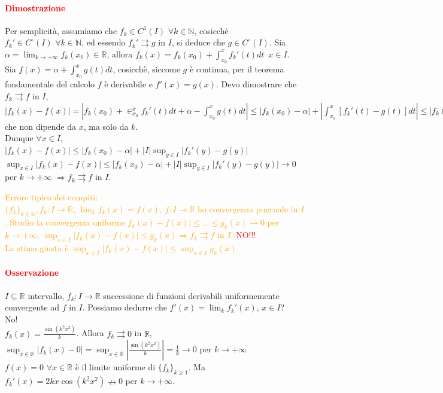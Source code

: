 \documentclass{article}
\newcommand{\R}{\mathbb{R}}
\newcommand{\N}{\mathbb{N}}
\begin{document}
\paragraph{\textcolor{red}{Dimostrazione}}
Per semplicità, assumiamo che $f_k\in C^1(I)\,\, \forall k \in \N$, cosicchè $f_k' \in C^\circ(I) \,\, \forall k \in \N$, ed essendo $f_k' \rightrightarrows g$ in $I$, si deduce che $g \in C^\circ (I)$. Sia $\alpha = \lim_{k \rightarrow +\infty}f_k(x_0) \in \R$, allora $f_k(x) = f_k(x_0)+\int_{x_0}^{x}f_k' (t)dt\,\,\, x \in I $.\\
Sia $f(x) = \alpha + \int_{x_0}^{x}g(t) dt$, cosicchè, siccome $g$ è continua, per il teorema fondamentale del calcolo $f$ è derivabile e $f'(x) =g(x)$. Devo dimostrare che $f_k \rightrightarrows f$ in $I$, \\
$|f_k(x)-f(x)|= |f_k(x_0)+ \in_{x_0}^{x}f_k' (t) dt+\alpha - \int_{x_0}^{x}g(t) dt|\leq |f_k(x_0)-\alpha|+|\int_{x_0}^{x}[f_k'(t)-g(t)] dt|\leq |f_k(x_0)-\alpha| + |\int_{x_0}^{x}|f_k'(t)-g(t)|dt|\leq |f_k(x_0)-\alpha| + |\int_{x_0}^{x}\sup_{y \in I}|f_k'(y)-g(y)|dt|=|f_k(x_0)-\alpha|+ |x-x_0|\sup_{y \in I}|f_k'(y)-g(y)|\leq |f_k(x_0)-\alpha|+|I|\sup_{y\in I}|f_k'(y)-g(y)|$ che non dipende da $x$, ma solo da $k$.\\
Dunque $\forall x \in I$, $|f_k(x)-f(x)| \leq |f_k(x_0)-\alpha|+|I|\sup_{y\in I}|f_k'(y)-g(y)| $\\
$\sup_{x\in I}|f_k(x)-f(x)|\leq |f_k(x_0)-\alpha|+|I|\sup_{y \in I}|f_k'(y)-g(y)|\rightarrow0$ per $k \rightarrow +\infty$ $\Rightarrow f_k \rightrightarrows f$ in $I$.
\begin{flushright}
\large\Lightning
\end{flushright}

\textcolor{orange}{Errore tipico dei compiti:\\
$\{f_k\}_{k \in \N}, f_k: I \rightarrow \R$, $\lim_{k}f_k(x) = f(x)$, $f: I \rightarrow \R$ ho convergenza puntuale in $I$. Studio la convergenza uniforme $f_k(x) -f(x)|\leq ... \leq g_k(x) \rightarrow 0$ per $k \rightarrow +\infty$, $\sup_{x \in I}|f_k(x)-f(x)|\leq g_k(x) \Rightarrow f_k \rightrightarrows f$ in $I$.
} \textcolor{red}{NO!!!}\\
\textcolor{orange}{La stima giusta è $\sup_{x \in I} |f_k(x)-f(x)|\leq \sup_{x \in I}g_k(x)$.}

\paragraph{\textcolor{red}{Osservazione}}
$I \subseteq \R$ intervallo, $f_k: I \rightarrow \R$ successione di funzioni derivabili uniformemente convergente ad $f$ in $I$. Possiamo dedurre che $f'(x) = \lim_{k}f_k'(x)$, $x \in I$?\\
No!\\
$f_k(x)=\frac{\sin(k^2x^2)}{k}$. Allora $f_k \rightrightarrows 0$ in $\R$, $\sup_{x \in \R}|f_k(x)-0|= \sup_{x \in \R}|\frac{\sin(k^2x^2)}{k}|= \frac{1}{k}\rightarrow 0$ per $k \rightarrow+\infty$\\
$f(x)=0 \,\, \forall x \in \R$ è il limite uniforme di $\{f_k\}_{k\geq 1}$. Ma $f_k'(x)=2kx\cos(k^2x^2)\nrightarrow 0$ per $k \rightarrow +\infty$.
\end{document}
